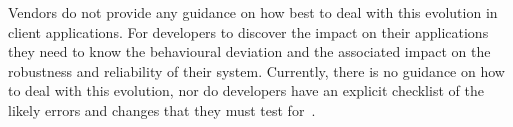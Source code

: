 Vendors do not provide any guidance on how best to deal with this evolution in client applications. For developers to discover the impact on their applications they need to know the behavioural deviation and the associated impact on the robustness and reliability of their system. Currently, there is no guidance on how to deal with this evolution, nor do developers have an explicit checklist of the likely errors and changes that they must test for~\citep{Cummaudo:2020icse}.













